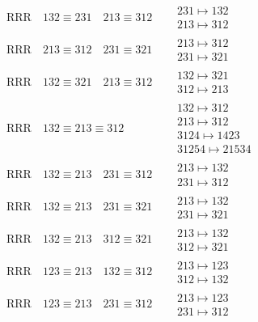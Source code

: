 \documentclass{article}
\begin{document}
\begin{align}
\text{RRR}
\quad
132\equiv231
\quad
213\equiv312
\quad
&
\begin{matrix}
231 \mapsto 132
\\
213 \mapsto 312
\end{matrix}
\\
\text{RRR}
\quad
213\equiv312
\quad
231\equiv321
\quad
&
\begin{matrix}
213 \mapsto 312
\\
231 \mapsto 321
\end{matrix}
\\
\text{RRR}
\quad
132\equiv321
\quad
213\equiv312
\quad
&
\begin{matrix}
132 \mapsto 321
\\
312 \mapsto 213
\end{matrix}
\\
\text{RRR}
\quad
132\equiv213\equiv312
\quad
&
\begin{matrix}
132 \mapsto 312
\\
213 \mapsto 312
\\
3124 \mapsto 1423
\\
31254 \mapsto 21534
\end{matrix}
\\
\text{RRR}
\quad
132\equiv213
\quad
231\equiv312
\quad
&
\begin{matrix}
213 \mapsto 132
\\
231 \mapsto 312
\end{matrix}
\\
\text{RRR}
\quad
132\equiv213
\quad
231\equiv321
\quad
&
\begin{matrix}
213 \mapsto 132
\\
231 \mapsto 321
\end{matrix}
\\
\text{RRR}
\quad
132\equiv213
\quad
312\equiv321
\quad
&
\begin{matrix}
213 \mapsto 132
\\
312 \mapsto 321
\end{matrix}
\\
\text{RRR}
\quad
123\equiv213
\quad
132\equiv312
\quad
&
\begin{matrix}
213 \mapsto 123
\\
312 \mapsto 132
\end{matrix}
\\
\text{RRR}
\quad
123\equiv213
\quad
231\equiv312
\quad
&
\begin{matrix}
213 \mapsto 123
\\
231 \mapsto 312
\end{matrix}

\end{align}
\end{document}
